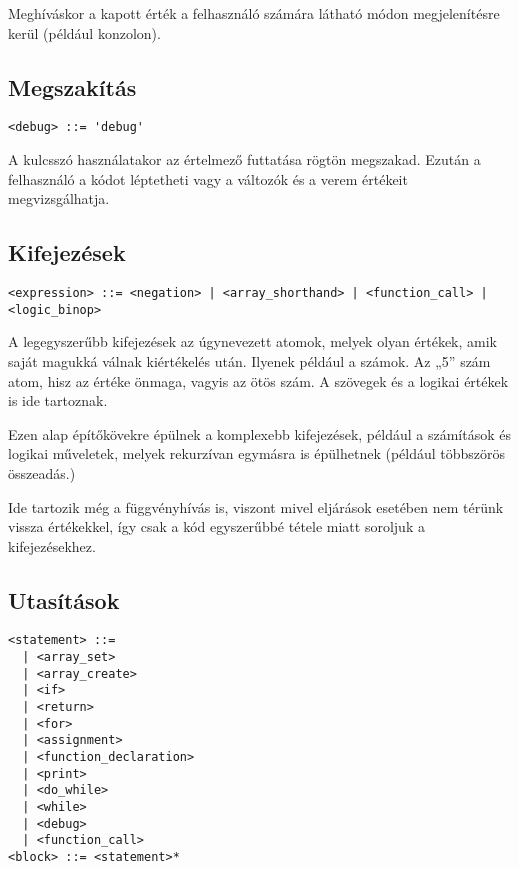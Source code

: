 Meghíváskor a kapott érték a felhasználó számára látható módon megjelenítésre kerül (például konzolon).

\subsection{Megszakítás}

\begin{footnotesize}
\begin{verbatim}
<debug> ::= 'debug'
\end{verbatim}
\end{footnotesize}

A kulcsszó használatakor az értelmező futtatása rögtön megszakad. Ezután a felhasználó a kódot léptetheti vagy a változók és a verem értékeit megvizsgálhatja.

\subsection{Kifejezések}

\begin{footnotesize}
\begin{verbatim}
<expression> ::= <negation> | <array_shorthand> | <function_call> | <logic_binop>
\end{verbatim}
\end{footnotesize}

A legegyszerűbb kifejezések az úgynevezett atomok, melyek olyan értékek, amik saját magukká válnak kiértékelés után. Ilyenek például a számok. Az „5” szám atom, hisz az értéke önmaga, vagyis az ötös szám. A szövegek és a logikai értékek is ide tartoznak.

Ezen alap építőkövekre épülnek a komplexebb kifejezések, például a számítások és logikai műveletek, melyek rekurzívan egymásra is épülhetnek (például többszörös összeadás.) 

Ide tartozik még a függvényhívás is, viszont mivel eljárások esetében nem térünk vissza értékekkel, így csak a kód egyszerűbbé tétele miatt soroljuk a kifejezésekhez.

\subsection{Utasítások}

\begin{footnotesize}
\begin{verbatim}
<statement> ::= 
  | <array_set> 
  | <array_create> 
  | <if> 
  | <return> 
  | <for> 
  | <assignment> 
  | <function_declaration> 
  | <print> 
  | <do_while> 
  | <while> 
  | <debug> 
  | <function_call>
<block> ::= <statement>*
\end{verbatim}
\end{footnotesize}

